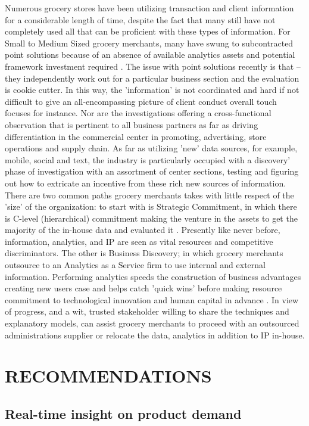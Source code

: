 \documentclass[sigconf]{acmart}
\begin{document}
Numerous grocery stores have been utilizing transaction and client information for a considerable length of time, despite the fact that many still have not completely used all that can be proficient with these types of information. For Small to Medium Sized grocery merchants, many have swung to subcontracted point solutions because of an absence of available analytics assets and potential framework investment required \cite{3, 4}. The issue with point solutions recently is that – they independently work out for a particular business section and the evaluation is cookie cutter. In this way, the 'information' is not coordinated and hard if not difficult to give an all-encompassing picture of client conduct overall touch focuses for instance.  Nor are the investigations offering a cross-functional observation that is pertinent to all business partners as far as driving differentiation in the commercial center in promoting, advertising, store operations and supply chain. 
 	As far as utilizing 'new' data sources, for example, mobile, social and text, the industry is particularly occupied with a discovery' phase of investigation with an assortment of center sections, testing and figuring out how to extricate an incentive from these rich new sources of information. There are two common paths grocery merchants takes with little respect of the 'size' of the organization: to start with is Strategic Commitment, in which there is C-level (hierarchical) commitment making the venture in the assets to get the majority of the in-house data and evaluated it \cite{1}.
 	Presently like never before, information, analytics, and IP are seen as vital resources and competitive discriminators. The other is Business Discovery; in which grocery merchants outsource to an Analytics as a Service firm to use internal and external information. Performing analytics speeds the construction of business advantages creating new users case and helps catch 'quick wins' before making resource commitment to technological innovation and human capital in advance \cite{4}. In view of progress, and a wit, trusted stakeholder willing to share the techniques and explanatory models, can assist grocery merchants to proceed with an outsourced administrations supplier or relocate the data, analytics in addition to IP in-house. 


\section{RECOMMENDATIONS}
\subsection{Real-time insight on product demand}
\end{document}
